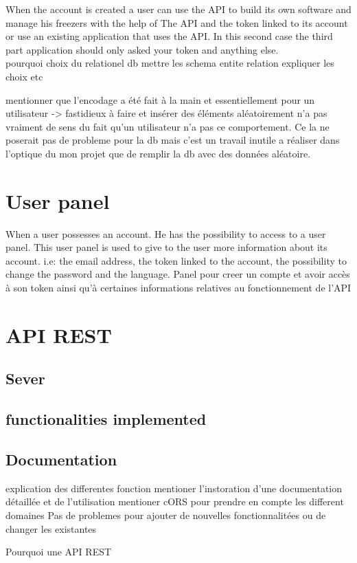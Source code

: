 When the account is created a user can use the API to build its own software and manage his freezers with the help of The API and the token linked to its account or use an existing application that uses the API. In this second case the third part application should only asked your token and anything else.\\

pourquoi choix du relationel db
mettre les schema entite relation expliquer les choix etc

 mentionner que l'encodage a été fait à la main et essentiellement pour un utilisateur -> fastidieux à faire et insérer des éléments aléatoirement n'a pas vraiment de sens du fait qu'un utilisateur n'a pas ce comportement. Ce la ne poserait pas de probleme pour la db mais c'est un travail inutile a réaliser dans l'optique du mon projet que de remplir la db avec des données aléatoire.
\section{User panel}
When a user possesses an account. He has the possibility to access to a user panel. This user panel is used to give to the user more information about its account. i.e: the email address, the token linked to the account, the possibility to change the password and the language.
Panel pour creer un compte et avoir accès à son token ainsi qu'à certaines informations relatives au fonctionnement de l'API

\section{API REST}
\subsection{Sever}
\subsection{functionalities implemented}
\subsection{Documentation}
explication des differentes fonction
 mentioner l'instoration d'une documentation détaillée et de l'utilisation 
 mentioner cORS pour prendre en compte les different domaines
 Pas de problemes pour ajouter de nouvelles fonctionnalitées ou de changer les existantes
 
 Pourquoi une API REST
 
